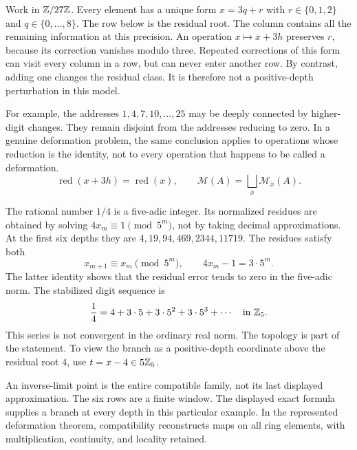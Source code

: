 Work in $\mathbb Z/27\mathbb Z$. Every element has a unique form $x=3q+r$ with $r\in\{0,1,2\}$ and $q\in\{0,\ldots,8\}$. The row below is the residual root. The column contains all the remaining information at this precision.
An operation $x\mapsto x+3h$ preserves $r$, because its correction vanishes modulo three. Repeated corrections of this form can visit every column in a row, but can never enter another row. By contrast, adding one changes the residual class. It is therefore not a positive-depth perturbation in this model.

For example, the addresses $1,4,7,10,\ldots,25$ may be deeply connected by higher-digit changes. They remain disjoint from the addresses reducing to zero. In a genuine deformation problem, the same conclusion applies to operations whose reduction is the identity, not to every operation that happens to be called a deformation.
\[
\operatorname{red}(x+3h)=\operatorname{red}(x),
\qquad
\mathcal M(A)=\bigsqcup_{\bar x}\mathcal M_{\bar x}(A).
\]

The rational number $1/4$ is a five-adic integer. Its normalized residues are obtained by solving $4x_m\equiv1\pmod{5^m}$, not by taking decimal approximations. At the first six depths they are $4,19,94,469,2344,11719$.
The residues satisfy both
\[
x_{m+1}\equiv x_m\pmod{5^m},
\qquad 4x_m-1=3\cdot5^m.
\]
The latter identity shows that the residual error tends to zero in the five-adic norm. The stabilized digit sequence is
\[
\frac14=4+3\cdot5+3\cdot5^2+3\cdot5^3+\cdots\quad\text{in }\mathbb Z_5.
\]
This series is not convergent in the ordinary real norm. The topology is part of the statement. To view the branch as a positive-depth coordinate above the residual root $4$, use $t=x-4\in5\mathbb Z_5$.

An inverse-limit point is the entire compatible family, not its last displayed approximation. The six rows are a finite window. The displayed exact formula supplies a branch at every depth in this particular example. In the represented deformation theorem, compatibility reconstructs maps on all ring elements, with multiplication, continuity, and locality retained.

